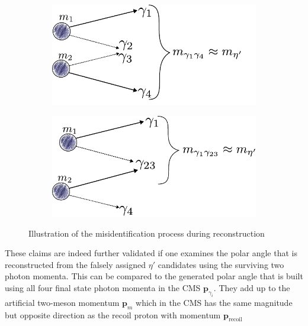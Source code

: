 	\begin{figure}[h]
	\centering
	\begin{subfigure}{.49\linewidth}
		\includegraphics[width=\linewidth]{../figs/inkscape/mcgammas1.pdf}
		\label{fig:mcgammas1}
	\end{subfigure}
	\begin{subfigure}{.49\linewidth}
		\includegraphics[width=\linewidth]{../figs/inkscape/mcgammas2.pdf}
		\label{fig:mcgammas2}
	\end{subfigure}
	\caption{Illustration of the misidentification process during reconstruction}

\end{figure}
These claims are indeed further validated if one examines the polar angle that is reconstructed from the falsely assigned $\eta'$ candidates using the surviving two photon momenta. This can be compared to the generated polar angle that is built using all four final state photon momenta in the CMS $\mathbf{p}_{\gamma_i}$. They add up to the artificial two-meson momentum $\mathbf{p}_m$ which in the CMS has the same magnitude but opposite direction as the recoil proton with momentum $\mathbf{p}_\text{recoil}$
